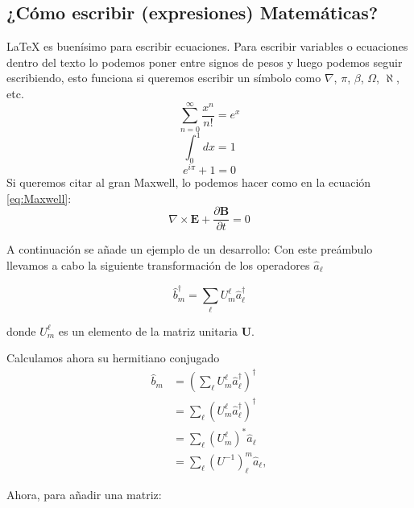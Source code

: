 \documentclass[a4paper]{article}
\begin{document}
\subsection{¿Cómo escribir (expresiones) Matemáticas?}

\LaTeX{} es buenísimo para escribir ecuaciones. Para escribir variables o ecuaciones dentro del texto lo podemos poner entre signos de pesos y luego podemos seguir escribiendo, esto funciona si queremos escribir un símbolo como $\nabla$, $\pi$, $\beta$, $\Omega$, $\aleph$, etc.
\begin{equation}
\sum_{n=0}^\infty \frac{x^n}{n!}=e^x
\end{equation}
\begin{equation}
\int_{0}^{1}dx=1
\end{equation}
\begin{equation}
e^{i\pi}+1=0
\end{equation}
Si queremos citar al gran Maxwell, lo podemos hacer como en la ecuación \ref{eq:Maxwell}:
\begin{equation}
\nabla\times\mathbf{E}+\frac{\partial\mathbf{B}}{\partial t}=0\label{eq:Maxwell}
\end{equation}

A continuación se añade un ejemplo de un desarrollo:
Con este preámbulo llevamos a cabo la siguiente transformación de los operadores $\hat{a}_{\ell}$

\begin{equation}
\hat{b}_{m}^{\dagger}=\sum_{\ell}U_{m}^{\ell}\hat{a}_{\ell}^{\dagger}
\end{equation}

donde $U_{m}^{\ell}$ es un elemento de la matriz unitaria $\mathbf{U}$.

Calculamos ahora su hermitiano conjugado
\begin{align}
\hat{b}_{m} & =\left(\sum_{\ell}U_{m}^{\ell}\hat{a}_{\ell}^{\dagger}\right)^{\dagger}\label{eq:bm}\\
 & =\sum_{\ell}\left(U_{m}^{\ell}\hat{a}_{\ell}^{\dagger}\right)^{\dagger}\nonumber \\
 & =\sum_{\ell}\left(U_{m}^{\ell}\right)^{*}\hat{a}_{\ell}\nonumber \\
 & =\sum_{\ell}\left(U^{-1}\right)_{\ell}^{m}\hat{a}_{\ell},\label{eq:bSubM}
\end{align}

Ahora, para añadir una matriz:
\end{document}
